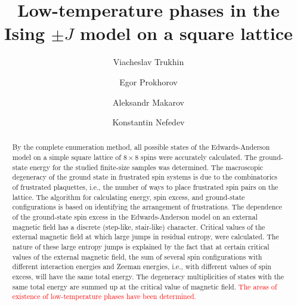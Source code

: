 \documentclass[preprint,12pt]{elsarticle}
\begin{document}
	
	\begin{frontmatter}
		
		
		\title{Low-temperature phases in the Ising $\pm J$ model on a square lattice}
		
		\author[mainaddress, secondaryaddress]{Viacheslav Trukhin}
		
		\author[mainaddress]{Egor Prokhorov}
		
		\author[mainaddress, secondaryaddress]{Aleksandr Makarov}
		
		\author[mainaddress, secondaryaddress]{Konstantin Nefedev}
		
		
		\address[mainaddress]{Far Eastern Federal University, Vladivostok, Russky Island, 10 Ajax Bay, 690922, the Russian Federation}
		\address[secondaryaddress]{Institute of Applied Mathematics, Far Eastern Branch, Russian Academy of Science, Vladivostok, Radio 7, 690041, the Russian Federation}
		
		\begin{abstract}
			
			By the complete enumeration method, all possible states of the Edwards-Anderson model on a simple square lattice of $8 \times 8$ spins were accurately calculated. The ground-state energy for the studied finite-size samples was determined. The macroscopic degeneracy of the ground state in frustrated spin systems is due to the combinatorics of frustrated plaquettes, i.e., the number of ways to place frustrated spin pairs on the lattice. The algorithm for calculating energy, spin excess, and ground-state configurations is based on identifying the arrangement of frustrations. The dependence of the ground-state spin excess in the Edwards-Anderson model on an external magnetic field has a discrete (step-like, stair-like) character. Critical values of the external magnetic field at which large jumps in residual entropy, were calculated. The nature of these large entropy jumps is explained by the fact that at certain critical values of the external magnetic field, the sum of several spin configurations with different interaction energies and Zeeman energies, i.e., with different values of spin excess, will have the same total energy. The degeneracy multiplicities of states with the same total energy are summed up at the critical value of magnetic field. \textcolor{red}{The areas of existence of low-temperature phases have been determined.}
			

\end{abstract}
\end{frontmatter}
\end{document}
